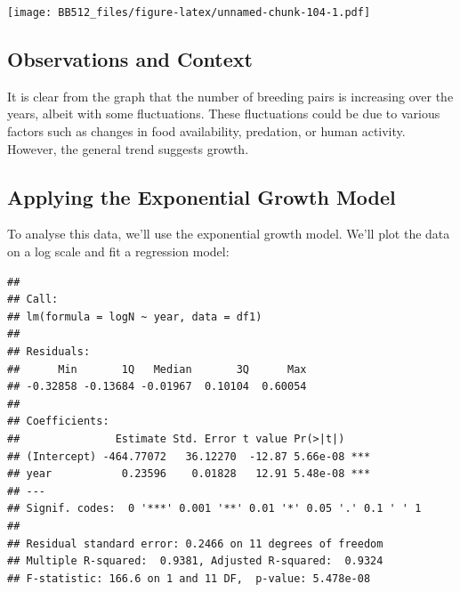 \documentclass[
  a4paper]{book}
\newenvironment{Shaded}{\begin{snugshade}}{\end{snugshade}}
\newcommand{\AttributeTok}[1]{\textcolor[rgb]{0.13,0.29,0.53}{#1}}
\newcommand{\FunctionTok}[1]{\textcolor[rgb]{0.13,0.29,0.53}{\textbf{#1}}}
\newcommand{\NormalTok}[1]{#1}
\newcommand{\OtherTok}[1]{\textcolor[rgb]{0.56,0.35,0.01}{#1}}
\newcommand{\SpecialCharTok}[1]{\textcolor[rgb]{0.81,0.36,0.00}{\textbf{#1}}}
\begin{document}
\texttt{[image: BB512\_files/figure-latex/unnamed-chunk-104-1.pdf]}

\hypertarget{observations-and-context}{%
\subsection{Observations and Context}\label{observations-and-context}}

It is clear from the graph that the number of breeding pairs is increasing over the years, albeit with some fluctuations. These fluctuations could be due to various factors such as changes in food availability, predation, or human activity. However, the general trend suggests growth.

\hypertarget{applying-the-exponential-growth-model}{%
\subsection{Applying the Exponential Growth Model}\label{applying-the-exponential-growth-model}}

To analyse this data, we'll use the exponential growth model. We'll plot the data on a log scale and fit a regression model:

\begin{Shaded}
\end{Shaded}

\begin{verbatim}
## 
## Call:
## lm(formula = logN ~ year, data = df1)
## 
## Residuals:
##      Min       1Q   Median       3Q      Max 
## -0.32858 -0.13684 -0.01967  0.10104  0.60054 
## 
## Coefficients:
##               Estimate Std. Error t value Pr(>|t|)    
## (Intercept) -464.77072   36.12270  -12.87 5.66e-08 ***
## year           0.23596    0.01828   12.91 5.48e-08 ***
## ---
## Signif. codes:  0 '***' 0.001 '**' 0.01 '*' 0.05 '.' 0.1 ' ' 1
## 
## Residual standard error: 0.2466 on 11 degrees of freedom
## Multiple R-squared:  0.9381, Adjusted R-squared:  0.9324 
## F-statistic: 166.6 on 1 and 11 DF,  p-value: 5.478e-08
\end{verbatim}
\end{document}
